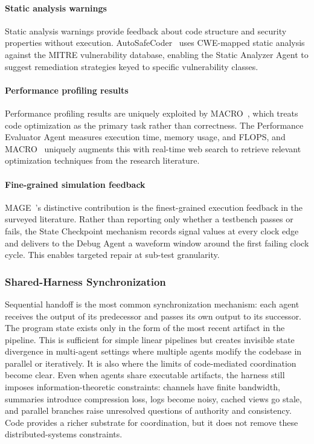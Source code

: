 \documentclass{llmxive}
\begin{document}
\paragraph{Static analysis warnings} Static analysis warnings
provide feedback about code structure and security properties
without execution. AutoSafeCoder~\cite{Nunez2024AutoSafeCoder}
uses CWE-mapped static analysis against the MITRE vulnerability
database, enabling the Static Analyzer Agent to suggest
remediation strategies keyed to specific vulnerability classes.

\paragraph{Performance profiling results} Performance profiling
results are uniquely exploited by MACRO~\cite{Rahman2025MACRO},
which treats code optimization as the primary task rather than
correctness. The Performance Evaluator Agent measures execution
time, memory usage, and FLOPS, and MACRO~\cite{Rahman2025MACRO} uniquely augments this
with real-time web search to retrieve relevant optimization
techniques from the research literature.

\paragraph{Fine-grained simulation feedback} MAGE~\cite{Zhao2024MAGE}'s
distinctive contribution is the finest-grained execution feedback
in the surveyed literature. Rather than reporting only whether a
testbench passes or fails, the State Checkpoint mechanism records
signal values at every clock edge and delivers to the Debug Agent
a waveform window around the first failing clock cycle. This
enables targeted repair at sub-test granularity.


\subsubsection{Shared-Harness Synchronization}

Sequential handoff is the most common synchronization mechanism:
each agent receives the output of its predecessor and passes its
own output to its successor. The program state exists only in the
form of the most recent artifact in the pipeline. This is
sufficient for simple linear pipelines but creates invisible
state divergence in multi-agent settings where multiple agents
modify the codebase in parallel or iteratively. {It
is also where the limits of code-mediated coordination become
clear. Even when agents share executable artifacts, the harness
still imposes information-theoretic constraints: channels have
finite bandwidth, summaries introduce compression loss, logs
become noisy, cached views go stale, and parallel branches raise
unresolved questions of authority and consistency. Code provides
a richer substrate for coordination, but it does not remove
these distributed-systems constraints.}
\end{document}

